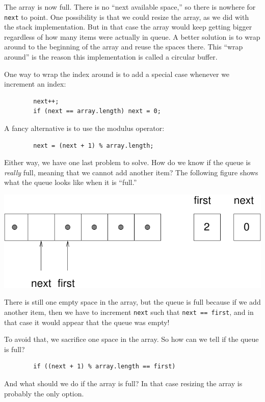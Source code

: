 \documentclass[12pt]{book}
\theoremstyle{exercise}
\begin{document}
The array is now full.  There is no ``next available space,'' so there
is nowhere for {\tt next} to point.  One possibility is that we could
resize the array, as we did with the stack implementation.  But in that
case the array would keep getting bigger regardless of how many items
were actually in queue.  A better solution is to wrap around to the
beginning of the array and reuse the spaces there.  This ``wrap around''
is the reason this implementation is called a circular buffer.

One way to wrap the index around is to add a special case whenever
we increment an index:

\begin{verbatim}
        next++;
        if (next == array.length) next = 0; 
\end{verbatim}
%
A fancy alternative is to use the modulus operator:

\begin{verbatim}
        next = (next + 1) % array.length;
\end{verbatim}
%
Either way, we have one last problem to solve.  How do we know
if the queue is {\em really} full, meaning that we cannot add
another item?  The following figure shows what the queue looks
like when it is ``full.''

\includegraphics{figs/queue5.pdf}

There is still one empty space in the array, but the queue is
full because if we add another item, then we have to increment
{\tt next} such that {\tt next == first}, and in that case it
would appear that the queue was empty!

To avoid that, we sacrifice one space in the array.  So how
can we tell if the queue is full?

\begin{verbatim}
        if ((next + 1) % array.length == first)
\end{verbatim}
%
And what should we do if the array is full?  In that case resizing
the array is probably the only option.
\end{document}
